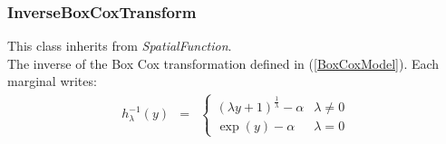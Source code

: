 \newpage
\subsubsection{InverseBoxCoxTransform}


This class inherits from \textit{SpatialFunction}. \\
The inverse of the Box Cox transformation defined in (\ref{BoxCoxModel}). Each marginal writes:
\begin{eqnarray}
\label{InverseBoxCoxModel}
h^{-1}_{\lambda}(y) & = &
\left\{
\begin{array}{ll}
\displaystyle (\lambda y + 1)^{\frac{1}{\lambda}} -\alpha& \lambda \neq 0 \\
\displaystyle \exp(y)-\alpha                      & \lambda = 0
\end{array}
\right.
\end{eqnarray}




